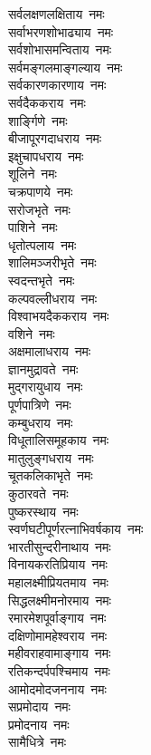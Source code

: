 \begin{multicols}{2}
\begin{flushleft}
सर्वलक्षणलक्षिताय~नमः\\
सर्वाभरणशोभाढ्याय~नमः\\
सर्वशोभासमन्विताय~नमः\\
सर्वमङ्गलमाङ्गल्याय~नमः\\
सर्वकारणकारणाय~नमः\hfill{}\\
सर्वदैककराय~नमः\\
शार्ङ्गिणे~नमः\\
बीजापूरगदाधराय~नमः\\
इक्षुचापधराय~नमः\\
शूलिने~नमः\\
चक्रपाणये~नमः\\
सरोजभृते~नमः\\
पाशिने~नमः\\
धृतोत्पलाय~नमः\\
शालिमञ्जरीभृते~नमः\hfill{}\\
स्वदन्तभृते~नमः\\
कल्पवल्लीधराय~नमः\\
विश्वाभयदैककराय~नमः\\
वशिने~नमः\\
अक्षमालाधराय~नमः\\
ज्ञानमुद्रावते~नमः\\
मुद्गरायुधाय~नमः\\
पूर्णपात्रिणे~नमः\\
कम्बुधराय~नमः\\
विधूतालिसमूहकाय~नमः\hfill{}\\
मातुलुङ्गधराय~नमः\\
चूतकलिकाभृते~नमः\\
कुठारवते~नमः\\
पुष्करस्थाय~नमः\\
स्वर्णघटीपूर्णरत्नाभिवर्षकाय~नमः\\
भारतीसुन्दरीनाथाय~नमः\\
विनायकरतिप्रियाय~नमः\\
महालक्ष्मीप्रियतमाय~नमः\\
सिद्धलक्ष्मीमनोरमाय~नमः\\
रमारमेशपूर्वाङ्गाय~नमः\hfill{}\\
दक्षिणोमामहेश्वराय~नमः\\
महीवराहवामाङ्गाय~नमः\\
रतिकन्दर्पपश्चिमाय~नमः\\
आमोदमोदजननाय~नमः\\
सप्रमोदाय~नमः\\
प्रमोदनाय~नमः\\
सामैधित्रे~नमः\\

\end{flushleft}
\end{multicols}

